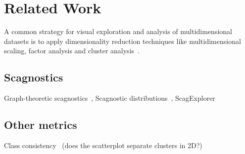 \section{Related Work}

A common strategy for visual exploration and analysis of multidimensional datasets is to apply dimensionality reduction techniques like multidimensional scaling, factor analysis and cluster analysis~\cite{Yang2003}. 

\subsection{Scagnostics}

Graph-theoretic scagnostics~\cite{Wilkinson2005}, Scagnostic distributions~\cite{Wilkinson2008}, ScagExplorer~\cite{Dang2014}

\subsection{Other metrics}

Class consistency~\cite{Sips2009} (does the scatterplot separate clusters in 2D?)
